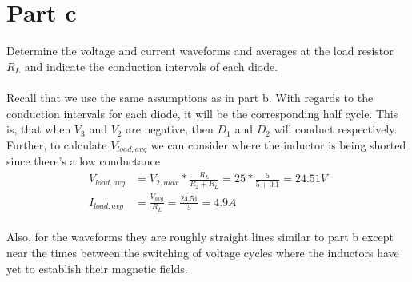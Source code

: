 \documentclass{article}
\begin{document}
\begin{center}
\end{center}


\section*{Part c}
Determine the voltage and current waveforms and averages at the load resistor $R_L$ and indicate the conduction intervals of each diode.\\
\\ Recall that we use the same assumptions as in part b. With regards to the conduction intervals for each diode, it will be the corresponding half cycle. This is, that when $V_3$ and $V_2$ are negative, then $D_1$ and $D_2$ will conduct respectively. Further, to calculate $V_{load,avg}$ we can consider where the inductor is being shorted since there's a low conductance
\begin{align*}
    V_{load, avg} &= V_{2,max} * \frac{R_L}{R_2+R_L} = 25*\frac{5}{5+0.1} = 24.51V\\
    I_{load, avg} &= \frac{V_{avg}}{R_L} = \frac{24.51}{5} = 4.9A
\end{align*}
\\ Also, for the waveforms they are roughly straight lines similar to part b except near the times between the switching of voltage cycles where the inductors have yet to establish their magnetic fields.
\end{document}
